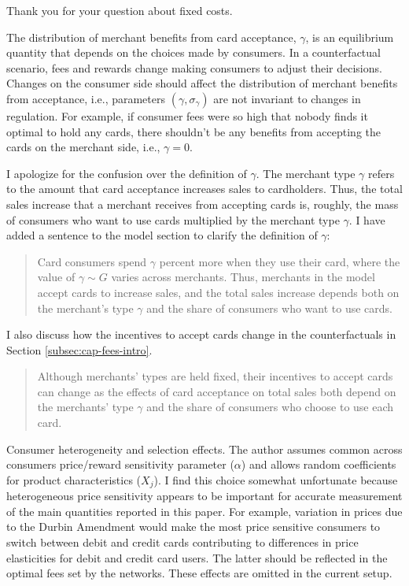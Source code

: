 \documentclass[main.tex]{subfiles}
\begin{document}
\begin{refsection}
Thank you for your question about fixed costs.
\replyfixedcostsize

\begin{refcomment}
The distribution of merchant benefits from card acceptance, \(\gamma\), is an equilibrium quantity that depends on the choices made by consumers.
In a counterfactual scenario, fees and rewards change making consumers to adjust their decisions.
Changes on the consumer side should affect the distribution of merchant benefits from acceptance, i.e., parameters $(\gamma ,\sigma_\gamma)$ are not invariant to changes in regulation.
For example, if consumer fees were so high that nobody finds it optimal to hold any cards, there shouldn't be any benefits from accepting the cards on the merchant side, i.e., \(\gamma = 0\).
\end{refcomment}

I apologize for the confusion over the definition of $\gamma$.
The merchant type $\gamma$ refers to the amount that card acceptance increases sales to cardholders.
Thus, the total sales increase that a merchant receives from accepting cards is, roughly, the mass of consumers who want to use cards multiplied by the merchant type $\gamma$.
I have added a sentence to the model section to clarify the definition of $\gamma$:

\begin{quotation}
    Card consumers spend $\gamma$ percent more when they use their card, where the value of $\gamma\sim G$ varies across merchants.
    Thus, merchants in the model accept cards to increase sales, and the total sales increase depends both on the merchant's type $\gamma$ and the share of consumers who want to use cards.
\end{quotation}

I also discuss how the incentives to accept cards change in the counterfactuals in Section \ref{subsec:cap-fees-intro}.
\begin{quote}
    Although merchants' types are held fixed, their incentives to accept cards can change as the effects of card acceptance on total sales both depend on the merchants' type $\gamma$ and the share of consumers who choose to use each card.
\end{quote}

\begin{refcomment}
Consumer heterogeneity and selection effects.
The author assumes common across consumers price/reward sensitivity parameter (\(\alpha\)) and allows random coefficients for product characteristics (\(X_j\)).
I find this choice somewhat unfortunate because heterogeneous price sensitivity appears to be important for accurate measurement of the main quantities reported in this paper.
For example, variation in prices due to the Durbin Amendment would make the most price sensitive consumers to switch between debit and credit cards contributing to differences in price elasticities for debit and credit card users.
The latter should be reflected in the optimal fees set by the networks.
These effects are omitted in the current setup.
\end{refcomment}


\end{refsection}
\end{document}
